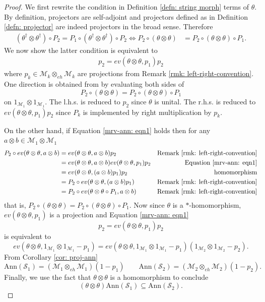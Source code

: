 \documentclass[12pt]{article}
\theoremstyle{definition}
\newcommand{\mc}[1]{\mathcal{#1}}
\newcommand{\<}{\langle}
\renewcommand{\>}{\rangle}
\newcommand{\Ann}{\text{Ann}}
\newcommand{\eh}{\otimes_{eh}}
\begin{document}
\begin{proof}
    We first rewrite the condition in Definition \ref{defn: string morph} terms of $\theta$. By definition, projectors are self-adjoint \cite[Section 1.4]{musto-reutter-verdon} and projectors defined as in Definition \ref{defn: projector} are indeed projectors in the broad sense. Therefore
    \begin{align*}
        (\theta^\dagger \otimes \theta^\dagger) \circ P_{2} = P_{1} \circ (\theta^\dagger \otimes \theta^\dagger) \circ P_{2} \iff P_{2} \circ (\theta \otimes \theta) &= P_{2} \circ (\theta \otimes \theta) \circ P_{1}.
    \end{align*}
    We now show the latter condition is equivalent to 
    \begin{align} \label{mrv-ann: eqn1}
      p_2 = ev(\theta \otimes \theta, p_1)p_2  
    \end{align}
    where $p_k \in \mc M_k \eh \mc M_k$ are projections from Remark \ref{rmk: left-right-convention}. One direction is obtained from by evaluating both sides of
    \[
    P_{2} \circ (\theta \otimes \theta) = P_{2} \circ (\theta \otimes \theta) \circ P_{1}
    \]
    on $1_{\mc M_1} \otimes 1_{\mc M_1}$. The l.h.s. is reduced to $p_2$ since $\theta$ is unital. The r.h.s. is reduced to $ev(\theta \otimes \theta, p_1)p_2$ since $P_k$ is implemented by right multiplication by $p_k$.
    
    On the other hand, if Equation \ref{mrv-ann: eqn1} holds then for any $a \otimes b \in \mc M_1 \otimes \mc M_1$
    \begin{align*}
        P_{2} \circ ev(\theta \otimes \theta, a \otimes b) &= ev(\theta \otimes \theta, a \otimes b)  p_{2} & \text{Remark } \ref{rmk: left-right-convention} \\
        &= ev(\theta \otimes \theta, a \otimes b) ev(\theta \otimes \theta, p_1)p_2 &\text{Equation } \ref{mrv-ann: eqn1} \\
        &= ev(\theta \otimes \theta, (a \otimes b)p_1)p_2 &\text{homomorphism} \\
        &= P_2 \circ ev(\theta \otimes \theta, (a \otimes b)p_1) & \text{Remark } \ref{rmk: left-right-convention} \\
        &= P_2 \circ ev(\theta \otimes \theta \circ P_1, a \otimes b) & \text{Remark } \ref{rmk: left-right-convention}
    \end{align*} 
    that is, $P_2 \circ (\theta \otimes \theta) = P_2 \circ (\theta \otimes \theta) \circ P_1$. Now since $\theta$ is a $*$-homomorphism, $ev(\theta \otimes \theta, p_1)$ is a projection and Equation \ref{mrv-ann: eqn1}
    \[
    p_2 = ev(\theta \otimes \theta, p_1) p_2
    \]
    is equivalent to 
    \[
    ev(\theta \otimes \theta, 1_{\mc M_1} \otimes 1_{\mc M_1} -p_1) = ev(\theta \otimes \theta, 1_{\mc M_1} \otimes 1_{\mc M_1} -p_1) (1_{\mc M_2} \otimes 1_{\mc M_2} -p_2).
    \]
    From Corollary \ref{cor: proj-ann}
    \[
    \Ann(\mc S_1) = (\mc M_1 \eh \mc M_1) (1-p_1) \qquad \Ann(\mc S_2) = (\mc M_2 \eh \mc M_2) (1-p_2).
    \]
    Finally, we use the fact that $\theta \otimes \theta$ is a homomorphism to conclude
    \[
    (\theta\otimes \theta)\Ann(\mc S_1) \subseteq \Ann(\mc S_2).
    \]
\end{proof}
\end{document}
